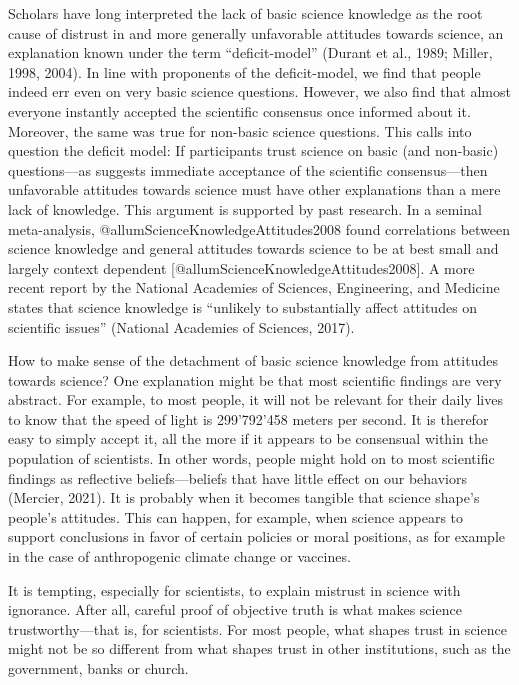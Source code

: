 \documentclass[
  doc,floatsintext]{apa6}
\begin{document}
Scholars have long interpreted the lack of basic science knowledge as the root cause of distrust in and more generally unfavorable attitudes towards science, an explanation known under the term ``deficit-model'' (Durant et al., 1989; Miller, 1998, 2004). In line with proponents of the deficit-model, we find that people indeed err even on very basic science questions. However, we also find that almost everyone instantly accepted the scientific consensus once informed about it. Moreover, the same was true for non-basic science questions. This calls into question the deficit model: If participants trust science on basic (and non-basic) questions---as suggests immediate acceptance of the scientific consensus---then unfavorable attitudes towards science must have other explanations than a mere lack of knowledge. This argument is supported by past research. In a seminal meta-analysis, @allumScienceKnowledgeAttitudes2008 found correlations between science knowledge and general attitudes towards science to be at best small and largely context dependent {[}@allumScienceKnowledgeAttitudes2008{]}. A more recent report by the National Academies of Sciences, Engineering, and Medicine states that science knowledge is ``unlikely to substantially affect attitudes on scientific issues'' (National Academies of Sciences, 2017).

How to make sense of the detachment of basic science knowledge from attitudes towards science? One explanation might be that most scientific findings are very abstract. For example, to most people, it will not be relevant for their daily lives to know that the speed of light is 299'792'458 meters per second. It is therefor easy to simply accept it, all the more if it appears to be consensual within the population of scientists. In other words, people might hold on to most scientific findings as reflective beliefs---beliefs that have little effect on our behaviors (Mercier, 2021). It is probably when it becomes tangible that science shape's people's attitudes. This can happen, for example, when science appears to support conclusions in favor of certain policies or moral positions, as for example in the case of anthropogenic climate change or vaccines.

It is tempting, especially for scientists, to explain mistrust in science with ignorance. After all, careful proof of objective truth is what makes science trustworthy---that is, for scientists. For most people, what shapes trust in science might not be so different from what shapes trust in other institutions, such as the government, banks or church.
\end{document}
